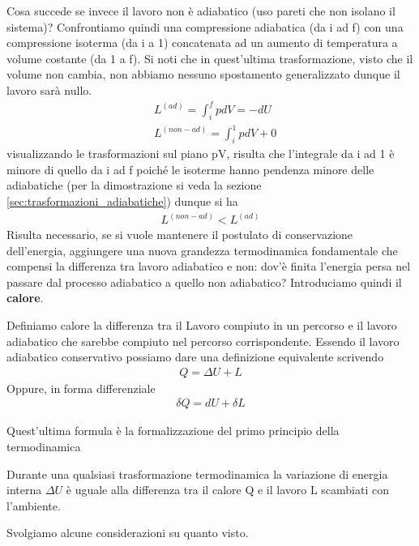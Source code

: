 \documentclass[
10pt, %
a4paper, %
oneside, %
headinclude,footinclude, %
BCOR5mm, %
]{scrartcl}
\begin{document}
Cosa succede se invece il lavoro non è adiabatico (uso pareti che non isolano il sistema)? Confrontiamo quindi una compressione adiabatica (da i ad f) con una compressione isoterma (da i a 1) concatenata ad un aumento di temperatura a volume costante (da 1 a f). Si noti che in quest'ultima trasformazione, visto che il volume non cambia, non abbiamo nessuno spostamento generalizzato dunque il lavoro sarà nullo. 
\begin{align*} 
	&L^{(ad)} = \int_{i}^{f} p dV = -dU\\
	&L^{(non-ad)} = \int_{i}^{1}pdV+0
\end{align*} 
visualizzando le trasformazioni sul piano pV, risulta che l'integrale da i ad 1 è minore di quello da i ad f poiché le isoterme hanno pendenza minore delle adiabatiche (per la dimostrazione si veda la sezione \ref{sec:trasformazioni_adiabatiche}) dunque si ha
\begin{align*} 
	L^{(non-ad)}<L^{(ad)}
\end{align*} 
Risulta necessario, se si vuole mantenere il postulato di conservazione dell'energia, aggiungere una nuova grandezza termodinamica fondamentale che compensi la differenza tra lavoro adiabatico e non: dov'è finita l'energia persa nel passare dal processo adiabatico a quello non adiabatico? Introduciamo quindi il \textbf{calore}.
\begin{definition}[Calore]
	Definiamo calore la differenza tra il Lavoro compiuto in un percorso e il lavoro adiabatico che sarebbe compiuto nel percorso corrispondente. Essendo il lavoro adiabatico conservativo possiamo dare una definizione equivalente scrivendo
	\begin{align*} 
		Q = \Delta U + L
	\end{align*} 
	Oppure, in forma differenziale
	\begin{align*}
		\delta Q = d U + \delta L
	\end{align*} 
\end{definition}
Quest'ultima formula è la formalizzazione del primo principio della termodinamica
\begin{definition}
	Durante una qualsiasi trasformazione termodinamica la variazione di energia interna $\Delta U$ è uguale alla differenza tra il calore Q e il lavoro L scambiati con l'ambiente. 
\end{definition}
Svolgiamo alcune considerazioni su quanto visto.
\end{document}
